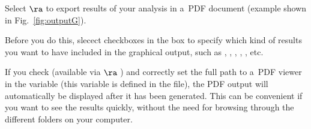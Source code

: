 \s Select  $\ra$  to export results of your analysis in a~PDF document (example shown in Fig.~\ref{fig:outputG}). 

\bul Before you do this, slecect checkboxes in the  box to specify which kind of results you want to have included in the graphical output, such as  , , , , , etc.

\bul If you check  (available via  $\ra$ ) and correctly set the full path to a~PDF viewer in the  variable (this variable is defined in the  file), the PDF output will automatically be displayed after it has been generated. This can be convenient if you want to see the results quickly, without the need for browsing through the different folders on your computer.

